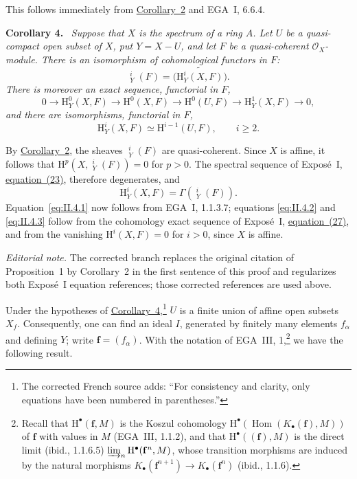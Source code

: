\documentclass[11pt,a4paper,oneside]{book}
\providecommand{\srcpage}[1]{%
  \marginpar{\raggedright\scriptsize\color{gray}Original French p.~#1}}
\providecommand{\ffam}{\mathbf f}
\providecommand{\uH}{\mathop{\underline{\mathrm H}}\nolimits}
\providecommand{\OX}{\mathcal O_X}
\newenvironment{sgastatement}[1]
  {\par\addvspace{0.8\baselineskip}\noindent\textbf{#1.}\ \itshape}
  {\par\addvspace{0.35\baselineskip}}
\theoremstyle{plain}
\theoremstyle{definition}
\theoremstyle{remark}
\begin{document}
This follows immediately from \hyperref[II.2]{Corollary~2} and EGA~I, 6.6.4.

\begin{sgastatement}{Corollary 4}
Suppose\srcpage{20} that $X$ is the spectrum of a ring $A$. Let $U$ be a
quasi-compact open subset of $X$, put $Y=X-U$, and let $F$ be a
quasi-coherent $\OX$-module. There is an isomorphism of cohomological
functors in $F$:
\begin{equation}
  \uH_Y^i(F)=\widetilde{\bigl(\mathrm H_Y^i(X,F)\bigr)}.
  \tag{4.1}\label{eq:II.4.1}
\end{equation}
There is moreover an exact sequence, functorial in $F$,
\begin{equation}
  0\longrightarrow \mathrm H_Y^0(X,F)
  \longrightarrow \mathrm H^0(X,F)
  \longrightarrow \mathrm H^0(U,F)
  \longrightarrow \mathrm H_Y^1(X,F)
  \longrightarrow 0,
  \tag{4.2}\label{eq:II.4.2}
\end{equation}
and there are isomorphisms, functorial in $F$,
\begin{equation}
  \mathrm H_Y^i(X,F)\simeq \mathrm H^{i-1}(U,F),
  \qquad i\geq 2.
  \tag{4.3}\label{eq:II.4.3}
\end{equation}
\end{sgastatement}

By \hyperref[II.2]{Corollary~2}, the sheaves $\uH_Y^i(F)$ are quasi-coherent. Since $X$ is
affine, it follows that
$\mathrm H^p(X,\uH_Y^i(F))=0$ for $p>0$. The spectral sequence of
Expos\'e~I, \hyperref[eq:I.23]{equation~(23)}, therefore degenerates, and
\[
  \mathrm H_Y^i(X,F)=\Gamma(\uH_Y^i(F)).
\]
Equation~\eqref{eq:II.4.1} now follows from EGA~I, 1.1.3.7; equations
\eqref{eq:II.4.2} and \eqref{eq:II.4.3} follow from the cohomology exact
sequence of Expos\'e~I, \hyperref[eq:I.27]{equation~(27)}, and from the vanishing
$\mathrm H^i(X,F)=0$ for $i>0$, since $X$ is affine.

\noindent\textit{Editorial note.} The corrected branch replaces the
original citation of Proposition~1 by Corollary~2 in the first sentence of
this proof and regularizes both Expos\'e~I equation references; those
corrected references are used above.

Under the hypotheses of \hyperref[II.4]{Corollary~4},\footnote{The corrected French source
adds: ``For consistency and clarity, only equations have been numbered in
parentheses.''} $U$ is a finite union of affine open subsets $X_f$.
Consequently, one can find an ideal $I$, generated by finitely many elements
$f_\alpha$ and defining $Y$; write $\ffam=(f_\alpha)$. With the notation of
EGA~III, 1,\footnote{Recall that $\mathrm H^\bullet(\ffam,M)$ is the Koszul
cohomology $\mathrm H^\bullet(\operatorname{Hom}(K_\bullet(\ffam),M))$ of
$\ffam$ with values in $M$ (EGA~III, 1.1.2), and that
$\mathrm H^\bullet((\ffam),M)$ is the direct limit (ibid., 1.1.6.5)
$\varinjlim_n\mathrm H^\bullet(\ffam^n,M)$, whose transition morphisms are
induced by the natural morphisms
$K_\bullet(\ffam^{n+1})\to K_\bullet(\ffam^n)$ (ibid., 1.1.6).} we have the
following result.
\end{document}

